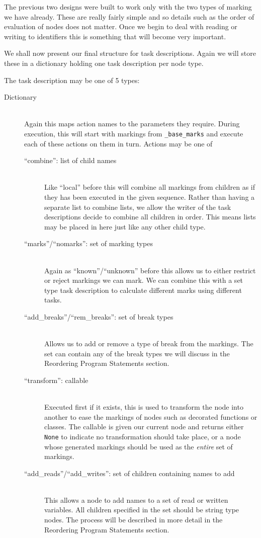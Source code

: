 \documentclass[twoside,a4paper]{report}
\begin{document}
The previous two designs were built to work only with the two types of marking we have already. These are really fairly simple and so details such
as the order of evaluation of nodes does not matter. Once we begin to deal with reading or writing to identifiers this is something that will become
very important.
 
We shall now present our final structure for task descriptions. Again we will store these in a dictionary holding one task description per node type.

The task description may be one of 5 types:

\begin{description}
\item[Dictionary] \hfill \\
Again this maps action names to the parameters they require. During execution, this will start with markings from \texttt{\_base\_marks} and
execute each of these actions on them in turn. Actions may be one of

\begin{description}
  \item[``combine'': list of child names] \hfill \\
  Like ``local'' before this will combine all markings from children as if they has been executed in the given sequence. Rather than having a
  separate list to combine lists, we allow the writer of the task descriptions decide to combine all children in order. This means lists may
  be placed in here just like any other child type.
  \item[``marks''/``nomarks'': set of marking types] \hfill \\
  Again as ``known''/``unknown'' before this allows us to either restrict or reject markings we can mark. We can combine this with a set type task
  description to calculate different marks using different tasks.
  \item[``add\_breaks''/``rem\_breaks'': set of break types] \hfill \\
  Allows us to add or remove a type of break from the markings. The set can contain any of the break types we will discuss in the Reordering
  Program Statements section.
  \item[``transform'': callable] \hfill \\
  Executed first if it exists, this is used to transform the node into another to ease the markings of nodes such as decorated functions or
  classes. The callable is given our current node and returns either \texttt{None} to indicate no transformation should take place, or a
  node whose generated markings should be used as the \textit{entire} set of markings.
  \item[``add\_reads''/``add\_writes'': set of children containing names to add] \hfill \\
  This allows a node to add names to a set of read or written variables. All children specified in the set should be string type nodes. The process
  will be described in more detail in the Reordering Program Statements section.
\end{description}


\end{description}
\end{document}
